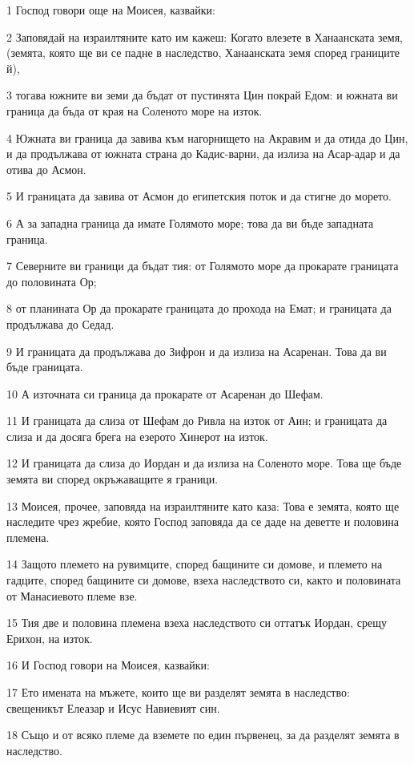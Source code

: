 \par 1 Господ говори още на Моисея, казвайки:
\par 2 Заповядай на израилтяните като им кажеш: Когато влезете в Ханаанската земя, (земята, която ще ви се падне в наследство, Ханаанската земя според границите й),
\par 3 тогава южните ви земи да бъдат от пустинята Цин покрай Едом: и южната ви граница да бъда от края на Соленото море на изток.
\par 4 Южната ви граница да завива към нагорнището на Акравим и да отида до Цин, и да продължава от южната страна до Кадис-варни, да излиза на Асар-адар и да отива до Асмон.
\par 5 И границата да завива от Асмон до египетския поток и да стигне до морето.
\par 6 А за западна граница да имате Голямото море; това да ви бъде западната граница.
\par 7 Северните ви граници да бъдат тия: от Голямото море да прокарате границата до половината Ор;
\par 8 от планината Ор да прокарате границата до прохода на Емат; и границата да продължава до Седад.
\par 9 И границата да продължава до Зифрон и да излиза на Асаренан. Това да ви бъде границата.
\par 10 А източната си граница да прокарате от Асаренан до Шефам.
\par 11 И границата да слиза от Шефам до Ривла на изток от Аин; и границата да слиза и да досяга брега на езерото Хинерот на изток.
\par 12 И границата да слиза до Иордан и да излиза на Соленото море. Това ще бъде земята ви според окръжаващите я граници.
\par 13 Моисея, прочее, заповяда на израилтяните като каза: Това е земята, която ще наследите чрез жребие, която Господ заповяда да се даде на деветте и половина племена.
\par 14 Защото племето на рувимците, според бащините си домове, и племето на гадците, според бащините си домове, взеха наследството си, както и половината от Манасиевото племе взе.
\par 15 Тия две и половина племена взеха наследството си оттатък Иордан, срещу Ерихон, на изток.
\par 16 И Господ говори на Моисея, казвайки:
\par 17 Ето имената на мъжете, които ще ви разделят земята в наследство: свещеникът Елеазар и Исус Навиевият син.
\par 18 Също и от всяко племе да вземете по един първенец, за да разделят земята в наследство.
